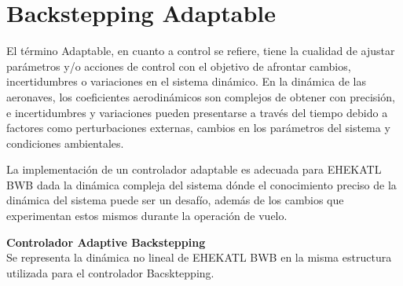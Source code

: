 \section{Backstepping Adaptable}

El término Adaptable, en cuanto a control se refiere, tiene la cualidad de ajustar parámetros y/o acciones de control con el objetivo de afrontar cambios, incertidumbres o variaciones en el sistema dinámico.
En la dinámica de las aeronaves, los coeficientes aerodinámicos son complejos de obtener con precisión, e incertidumbres y variaciones pueden presentarse a través del tiempo debido a factores como perturbaciones externas, cambios en los parámetros del sistema y condiciones ambientales. 


La implementación de un controlador adaptable es adecuada para EHEKATL BWB dada la dinámica compleja del sistema dónde el conocimiento preciso de la dinámica del sistema puede ser un desafío, además de los cambios que experimentan estos mismos durante la operación de vuelo. 

\medskip

\textbf{Controlador Adaptive Backstepping}\\
Se representa la dinámica no lineal de EHEKATL BWB en la misma estructura utilizada para el controlador Bacsktepping. 

